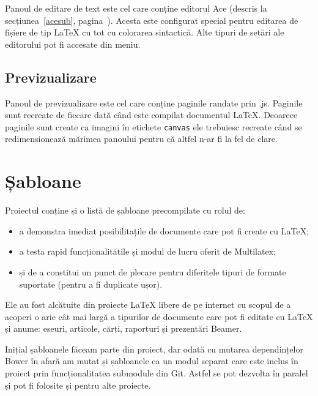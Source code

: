 \documentclass[a4wide,12pt]{report}
\newcommand{\cod}[1]{\texttt{#1}}
\newcommand{\acr}[1]{{\textsmaller[1]{\textsc{#1}}}} %
\begin{document}
Panoul de editare de text este cel care conține editorul Ace (descris la
secțiunea~\ref{acesub}, pagina~\pageref{acesub}). Acesta este configurat special
pentru editarea de fișiere de tip \LaTeX{} cu tot cu colorarea sintactică. Alte
tipuri de setări ale editorului pot fi accesate din meniu.

\subsection{Previzualizare}

Panoul de previzualizare este cel care conține paginile randate prin
\acr{PDF}.js. Paginile sunt recreate de fiecare dată când este compilat
documentul \LaTeX{}. Deoarece paginile sunt create ca imagini în etichete
\cod{canvas} ele trebuiesc recreate când se redimensionează mărimea panoului
pentru că altfel n-ar fi la fel de clare.

\section{Șabloane}
\label{sabloanesec}

Proiectul conține și o listă de șabloane precompilate cu rolul de:

\begin{itemize}

\item a demonstra imediat posibilitațile de documente care pot fi create cu
\LaTeX{};

\item a testa rapid funcționalitătile și modul de lucru oferit de Multilatex;

\item și de a constitui un punct de plecare pentru diferitele tipuri de formate
suportate (pentru a fi duplicate ușor).

\end{itemize}

Ele au fost alcătuite din proiecte \LaTeX{} libere de pe internet cu scopul de a
acoperi o arie cât mai largă a tipurilor de documente care pot fi editate cu
\LaTeX{} și anume: eseuri, articole, cărți, raporturi și prezentări Beamer.

Inițial șabloanele făceam parte din proiect, dar odată cu mutarea dependințelor
Bower în afară am mutat și șabloanele ca un modul separat care este inclus în
proiect prin funcționalitatea submodule din Git. Astfel se pot dezvolta în
paralel și pot fi folosite și pentru alte proiecte.
\end{document}

